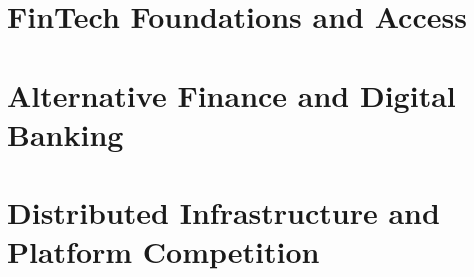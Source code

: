 \documentclass[11pt,oneside,a4paper]{report}
\begin{document}
\utpfrontmatter

\renewcommand{\thechapter}{1A}
\renewcommand{\theHchapter}{setup.1A}


\renewcommand{\thechapter}{1B}
\renewcommand{\theHchapter}{setup.1B}


\setcounter{chapter}{1}
\renewcommand{\thechapter}{\arabic{chapter}}
\renewcommand{\theHchapter}{\arabic{chapter}}

\part{FinTech Foundations and Access}



\part{Alternative Finance and Digital Banking}




\part{Distributed Infrastructure and Platform Competition}





\end{document}
